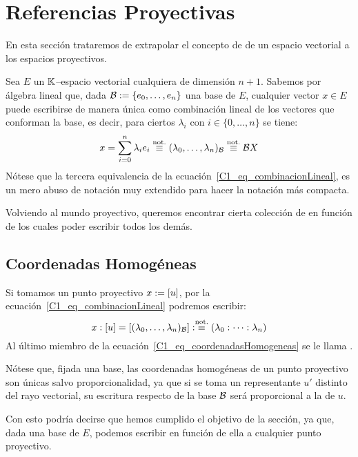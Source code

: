 \section{Referencias Proyectivas}
En esta sección trataremos de extrapolar el concepto de  de un espacio vectorial a los espacios proyectivos.

Sea $E$ un $\mathbb{K}$--espacio vectorial cualquiera de dimensión $n+1$. Sabemos por álgebra lineal que, dada $\mathcal{B}:=\{e_0,\dots,e_n\}$ una base de $E$, cualquier vector $x\in E$ puede escribirse de manera única como combinación lineal de los vectores que conforman la base, es decir, para ciertos $\lambda_i$ con $i\in\{0,\dots,n\}$ se tiene:
\begin{equation}
\label{C1_eq_combinacionLineal}
x=\sum_{i=0}^{n}\lambda_ie_i\stackrel{\textrm{not.}}{\equiv}(\lambda_0,\dots,\lambda_n)_{\mathcal{B}}\stackrel{\textrm{not.}}{\equiv}\mathcal{B}X
\end{equation}
Nótese que la tercera equivalencia de la ecuación~\eqref{C1_eq_combinacionLineal}, es un mero abuso de notación muy extendido para hacer la notación más compacta.

Volviendo al mundo proyectivo, queremos encontrar cierta colección de  en función de los cuales poder escribir todos los demás. 
\subsection{Coordenadas Homogéneas}
\label{C1_coordenadasHomogeneas}
Si tomamos un punto proyectivo $x:=\left [ u \right ]$, por la ecuación~\eqref{C1_eq_combinacionLineal} podremos escribir:
\begin{equation}
	\label{C1_eq_coordenadasHomogeneas}
	x:\left [ u \right ]=\left [ (\lambda_0,\dots,\lambda_n)_{\mathcal{B}} \right ]:\stackrel{\textrm{not.}}{\equiv}(\lambda_0:\dots:\lambda_n)
\end{equation}
Al último miembro de la ecuación~\eqref{C1_eq_coordenadasHomogeneas} se le llama .

Nótese que, fijada una base, las coordenadas homogéneas de un punto proyectivo son únicas salvo proporcionalidad, ya que si se toma un representante $u'$ distinto del rayo vectorial, su escritura respecto de la base $\mathcal{B}$ será proporcional a la de $u$.

Con esto podría decirse que hemos cumplido el objetivo de la sección, ya que, dada una base de $E$, podemos escribir en función de ella a cualquier punto proyectivo.

